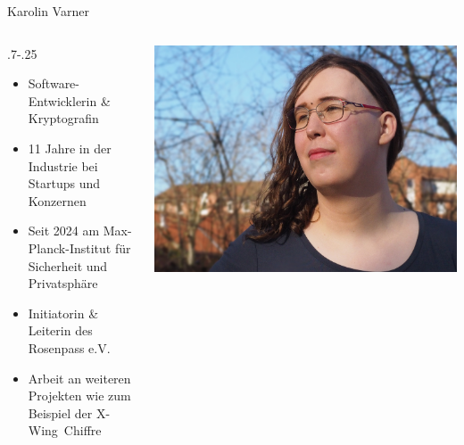 \begin{frame}{Karolin Varner}
  \begin{columns}[fullwidth,c]
	\hspace*{.25\LeftSlideIndent}%
    \begin{column}{\dimexpr.7\linewidth-.25\LeftSlideIndent}
      \begin{itemize}
        \item Software-Entwicklerin \& Kryptografin
        \item 11 Jahre in der Industrie bei Startups und Konzernen
        \item Seit 2024 am Max-Planck-Institut für Sicherheit und Privatsphäre
        \item Initiatorin \& Leiterin des Rosenpass e.V.
        \item Arbeit an weiteren Projekten wie zum Beispiel der X-Wing~Chiffre
      \end{itemize}
    \end{column}%
    \begin{column}{.3\linewidth}
      \includegraphics[width=.92\linewidth,trim=200 0 100 0,clip]{graphics/karolin-varner.jpg}
    \end{column}
  \end{columns}
\end{frame}

